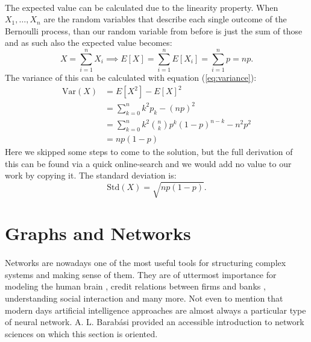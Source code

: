 \paragraph*{}
The expected value can be calculated due to the linearity property. When $ X_1,\dots , X_n $ are the random variables that describe each single outcome of the Bernoulli process, than our random variable from before is just the sum of those and as such also the expected value becomes:
\begin{equation}\label{eq:Bernoulli_expected_value}
X = \sum\limits_{i=1}^{n} X_i \implies E[X] = \sum\limits_{i=1}^{n} E[X_i] = \sum\limits_{i=1}^{n} p =np.
\end{equation}
The variance of this can be calculated with equation (\ref{eq:variance}):
\begin{equation}
\begin{split}
\text{Var}(X) &= E[X^2] - E[X]^2\\
&= \sum\limits_{k=0}^n k^2 p_k - (np)^2\\
&= \sum\limits_{k=0}^n k^2 {n \choose k} p^k(1-p)^{n-k} - n^2 p^2\\
&= np(1-p)
\end{split}
\end{equation}
Here we skipped some steps to come to the solution, but the full derivation of this can be found via a quick online-search and we would add no value to our work by copying it. The standard deviation is:
\begin{equation}
\text{Std}(X)=\sqrt{np(1-p)}.
\end{equation}

\section{Graphs and Networks}
\paragraph*{}
Networks are nowadays one of the most useful tools for structuring complex systems and making sense of them. They are of uttermost importance for modeling the human brain \cite{sanz2015mathematical}, credit relations between firms and banks \cite{gatti2006business}, understanding social interaction \cite{klemm2003nonequilibrium} and many more. Not even to mention that modern days artificial intelligence approaches are almost always a particular type of neural network. A. L. Barab\'{a}si provided an accessible introduction to network sciences \cite{barabasi2016network} on which this section is oriented.

